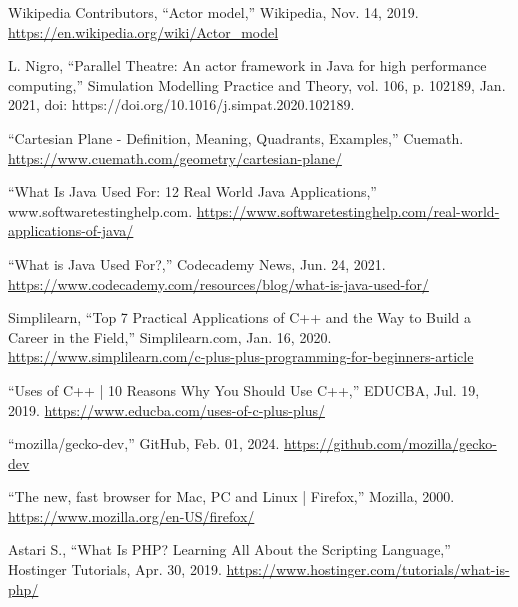 \documentclass[12pt]{report} %
\begin{document}
\begin{singlespace}
\begin{thebibliography}{}
             Wikipedia Contributors, “Actor model,” Wikipedia, Nov. 14, 2019. \href{https://en.wikipedia.org/wiki/Actor_model}{https://en.wikipedia.org/wiki/Actor\_model}
           
             L. Nigro, “Parallel Theatre: An actor framework in Java for high performance computing,” Simulation Modelling Practice and Theory, vol. 106, p. 102189, Jan. 2021, doi: https://doi.org/10.1016/j.simpat.2020.102189. 

             “Cartesian Plane - Definition, Meaning, Quadrants, Examples,” Cuemath. \href{https://www.cuemath.com/geometry/cartesian-plane/}{https://www.cuemath.com/geometry/cartesian-plane/}

             “What Is Java Used For: 12 Real World Java Applications,” www.softwaretestinghelp.com. \href{https://www.softwaretestinghelp.com/real-world-applications-of-java/}{https://www.softwaretestinghelp.com/real-world-applications-of-java/}

             “What is Java Used For?,” Codecademy News, Jun. 24, 2021. \href{https://www.codecademy.com/resources/blog/what-is-java-used-for/}{https://www.codecademy.com/resources/blog/what-is-java-used-for/}

             Simplilearn, “Top 7 Practical Applications of C++ and the Way to Build a Career in the Field,” Simplilearn.com, Jan. 16, 2020. \href{https://www.simplilearn.com/c-plus-plus-programming-for-beginners-article}{https://www.simplilearn.com/c-plus-plus-programming-for-beginners-article}

             “Uses of C++ | 10 Reasons Why You Should Use C++,” EDUCBA, Jul. 19, 2019. \href{https://www.educba.com/uses-of-c-plus-plus/}{https://www.educba.com/uses-of-c-plus-plus/}

             “mozilla/gecko-dev,” GitHub, Feb. 01, 2024. \href{https://github.com/mozilla/gecko-dev}{https://github.com/mozilla/gecko-dev}

             “The new, fast browser for Mac, PC and Linux | Firefox,” Mozilla, 2000. \href{https://www.mozilla.org/en-US/firefox/}{https://www.mozilla.org/en-US/firefox/}
        
             Astari S., “What Is PHP? Learning All About the Scripting Language,” Hostinger Tutorials, Apr. 30, 2019. \href{https://www.hostinger.com/tutorials/what-is-php/}{https://www.hostinger.com/tutorials/what-is-php/}


\end{thebibliography}
\end{singlespace}
\end{document}
